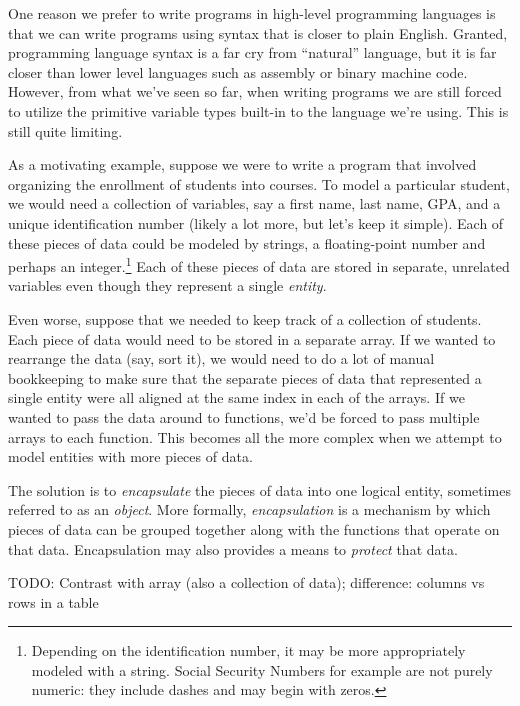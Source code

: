 

One reason we prefer to write programs in high-level programming
languages is that we can write programs using syntax that is closer 
to plain English.  Granted, programming language syntax is a far cry 
from ``natural'' language, but it is far closer than lower level 
languages such as assembly or binary machine code.  However, from
what we've seen so far, when writing programs we are still forced
to utilize the primitive variable types built-in to the language
we're using.  This is still quite limiting.

As a motivating example, suppose we were to write a program that
involved organizing the enrollment of students into courses.  To
model a particular student, we would need a collection of variables, 
say a first name, last name, GPA, and a unique identification number
(likely a lot more, but let's keep it simple).  Each of these
pieces of data could be modeled by strings, a floating-point number
and perhaps an integer.\footnote{Depending on the identification
number, it may be more appropriately modeled with a string.  Social
Security Numbers for example are not purely numeric: they include
dashes and may begin with zeros.}  Each of these pieces of 
data are stored in separate, unrelated variables even though they
represent a single \emph{entity}.  

Even worse, suppose that we needed to keep track of a collection
of students.  Each piece of data would need to be stored in 
a separate array.  If we wanted to rearrange the data (say, sort
it), we would need to do a lot of manual bookkeeping to make sure
that the separate pieces of data that represented a single entity
were all aligned at the same index in each of the arrays.  If we
wanted to pass the data around to functions, we'd be forced to
pass multiple arrays to each function.  This becomes all the more
complex when we attempt to model entities with more pieces of 
data.  

The solution is to \emph{encapsulate} the pieces of data into
one logical entity, sometimes referred to as an \emph{object}.  
More formally, \emph{encapsulation} is a mechanism by which
pieces of data can be grouped together along with the functions
that operate on that data.  Encapsulation may also provides a 
means to \emph{protect} that data.

TODO: Contrast with array (also a collection of data); difference: 
columns vs rows in a table

